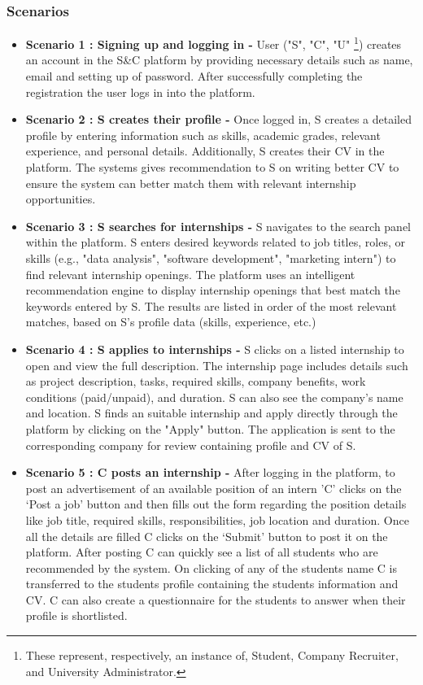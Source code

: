 \subsubsection{Scenarios}
\begin{itemize}
    \item \textbf{Scenario 1 : Signing up and logging in - } User ("S", "C", "U" \footnote{These represent, respectively, an instance of, Student, Company Recruiter, and University Administrator.}) creates an account in the S\&C platform by providing necessary details such as name, email and setting up of password. After successfully completing the registration the user logs in into the platform.
    \item \textbf{Scenario 2 : S creates their profile - } Once logged in, S creates a detailed profile by entering information such as skills, academic grades, relevant experience, and personal details. Additionally, S creates their CV in the platform. The systems gives recommendation to S on writing better CV to ensure the system can better match them with relevant internship opportunities.
    \item \textbf{Scenario 3 : S searches for internships - } S navigates to the search panel within the platform. S enters desired keywords related to job titles, roles, or skills (e.g., "data analysis", "software development", "marketing intern") to find relevant internship openings. The platform uses an intelligent recommendation engine to display internship openings that best match the keywords entered by S. The results are listed in order of the most relevant matches, based on S’s profile data (skills, experience, etc.)
    \item \textbf{Scenario 4 : S applies to internships - } S clicks on a listed internship to open and view the full description. The internship page includes details such as project description, tasks, required skills, company benefits, work conditions (paid/unpaid), and duration. S can also see the company's name and location. S finds an suitable internship and apply directly through the platform by clicking on the "Apply" button. The application is sent to the corresponding company for review containing profile and CV of S.
    \item \textbf{Scenario 5 : C posts an internship - } After logging in the platform, to post an advertisement of an available position of an intern 'C' clicks on the ‘Post a job’ button and then fills out the form regarding the position details like job title, required skills, responsibilities, job location and duration. Once all the details are filled C clicks on the ‘Submit’ button to post it on the platform. After posting C can quickly see a list of all students who are recommended by the system. On clicking of any of the students name C is transferred to the students profile containing the students information and CV. C can also create a questionnaire for the students to answer when their profile is shortlisted.

\end{itemize}
